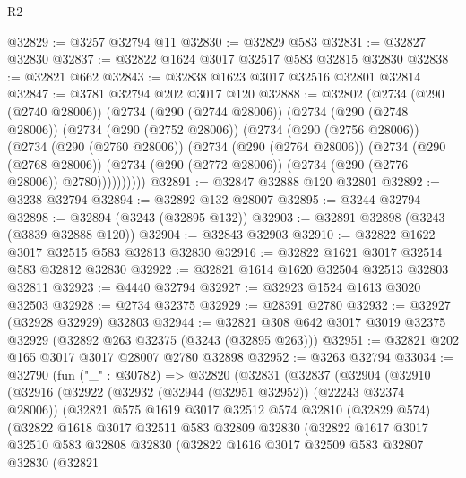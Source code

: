 \begin{lexlean}{R2}
\begin{coremodule}
@32829 := @3257 @32794 @11
@32830 := @32829 @583
@32831 := @32827 @32830
@32837 := @32822 @1624 @3017 @32517 @583 @32815 @32830
@32838 := @32821 @662
@32843 := @32838 @1623 @3017 @32516 @32801 @32814
@32847 := @3781 @32794 @202 @3017 @120
@32888 := @32802
    (@2734
      (@290 (@2740 @28006))
      (@2734
        (@290 (@2744 @28006))
        (@2734
          (@290 (@2748 @28006))
          (@2734
            (@290 (@2752 @28006))
            (@2734
              (@290 (@2756 @28006))
              (@2734
                (@290 (@2760 @28006))
                (@2734
                  (@290 (@2764 @28006))
                  (@2734
                    (@290 (@2768 @28006))
                    (@2734 (@290 (@2772 @28006)) (@2734 (@290 (@2776 @28006)) @2780))))))))))
@32891 := @32847 @32888 @120 @32801
@32892 := @3238 @32794
@32894 := @32892 @132 @28007
@32895 := @3244 @32794
@32898 := @32894 (@3243 (@32895 @132))
@32903 := @32891 @32898 (@3243 (@3839 @32888 @120))
@32904 := @32843 @32903
@32910 := @32822 @1622 @3017 @32515 @583 @32813 @32830
@32916 := @32822 @1621 @3017 @32514 @583 @32812 @32830
@32922 := @32821 @1614 @1620 @32504 @32513 @32803 @32811
@32923 := @4440 @32794
@32927 := @32923 @1524 @1613 @3020 @32503
@32928 := @2734 @32375
@32929 := @28391 @2780
@32932 := @32927 (@32928 @32929) @32803
@32944 := @32821 @308 @642 @3017 @3019 @32375 @32929 (@32892 @263 @32375 (@3243 (@32895 @263)))
@32951 := @32821 @202 @165 @3017 @3017 @28007 @2780 @32898
@32952 := @3263 @32794
@33034 := @32790
    (fun ("_" : @30782) =>
    @32820
      (@32831
        (@32837
          (@32904
            (@32910
              (@32916
                (@32922
                  (@32932 (@32944 (@32951 @32952)) (@22243 @32374 @28006))
                  (@32821
                    @575
                    @1619
                    @3017
                    @32512
                    @574
                    @32810
                    (@32829 @574)
                    (@32822
                      @1618
                      @3017
                      @32511
                      @583
                      @32809
                      @32830
                      (@32822
                        @1617
                        @3017
                        @32510
                        @583
                        @32808
                        @32830
                        (@32822
                          @1616
                          @3017
                          @32509
                          @583
                          @32807
                          @32830
                          (@32821

\end{coremodule}
\end{lexlean}
